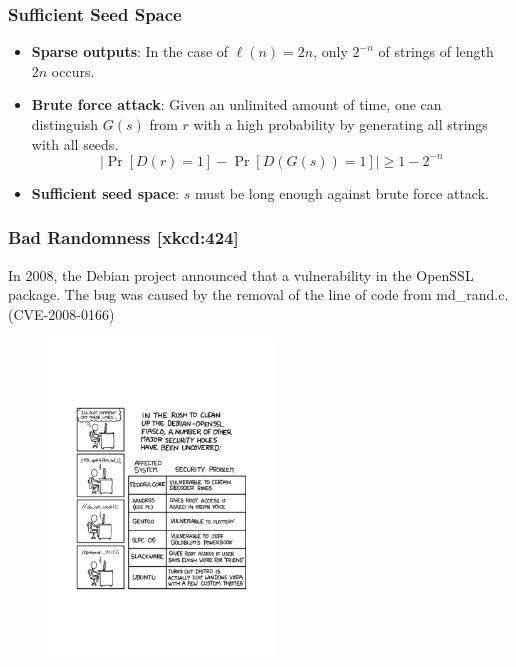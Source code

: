 \begin{frame}\frametitle{Sufficient Seed Space}
\begin{figure}
\begin{center}

\end{center}
\end{figure}
\begin{itemize}
\item \textbf{Sparse outputs}: In the case of $\ell(n)=2n$, only $2^{-n}$ of strings of length $2n$ occurs.
\item \textbf{Brute force attack}: Given an unlimited amount of time, one can distinguish $G(s)$ from $r$ with a high probability by generating all strings with all seeds.
\[  \left|\Pr[D(r)=1] - \Pr[D(G(s))=1]\right| \ge 1-2^{-n} \]
\item \textbf{Sufficient seed space}: $s$ must be long enough against brute force attack.
\end{itemize}
\end{frame}
\begin{frame}\frametitle{Bad Randomness [xkcd:424]}
In 2008, the Debian project announced that a vulnerability in the OpenSSL package. The bug was caused by the removal of the line of code from md\_rand.c. (CVE-2008-0166)
\begin{figure}
\begin{center}
\includegraphics[width=60mm]{pic/holes} 
\end{center}
\end{figure}
\end{frame}
